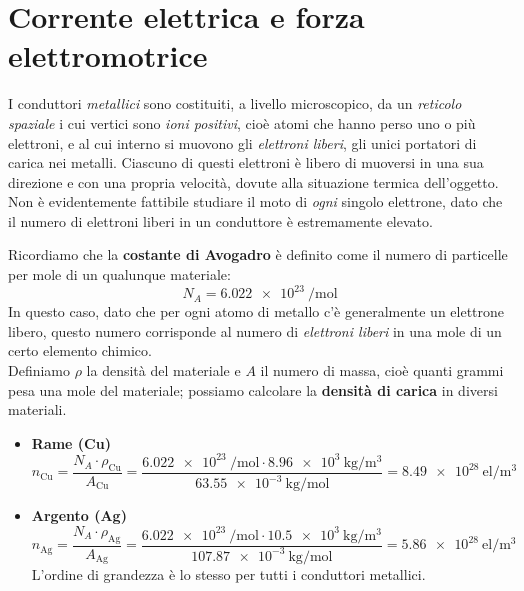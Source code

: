 \section{Corrente elettrica e forza elettromotrice}
I conduttori \textit{metallici} sono costituiti, a livello microscopico, da un \textit{reticolo spaziale} i cui vertici sono \textit{ioni positivi}, cioè atomi che hanno perso uno o più elettroni, e al cui interno si muovono gli \textit{elettroni liberi}, gli unici portatori di carica nei metalli.
Ciascuno di questi elettroni è libero di muoversi in una sua direzione e con una propria velocità, dovute alla situazione termica dell'oggetto. Non è evidentemente fattibile studiare il moto di \textit{ogni} singolo elettrone, dato che il numero di elettroni liberi in un conduttore è estremamente elevato.
\begin{examplewt}
	Ricordiamo che la \textbf{costante di Avogadro} è definito come il numero di particelle per mole di un qualunque materiale:
	\begin{equation*}
		N_A=\SI[exponent-product=\ensuremath{\cdot}]{6,022e23}{\per\mole}
	\end{equation*}
	In questo caso, dato che per ogni atomo di metallo c'è generalmente un elettrone libero, questo numero corrisponde al numero di \textit{elettroni liberi} in una mole di un certo elemento chimico.\\
	Definiamo $\rho$ la densità del materiale e $A$ il numero di massa, cioè quanti grammi pesa una mole del materiale; possiamo calcolare la \textbf{densità di carica} in diversi materiali.
	\begin{itemize}
		\item \textbf{Rame (Cu)}%
		\begin{equation*}
			n_{\textrm{Cu}}=\frac{N_A\cdot\rho_{\mathrm{Cu}}}{A_{\mathrm{Cu}}}=\frac{\SI[exponent-product=\ensuremath{\cdot}]{6,022e23}{\per\mole}\cdot\SI[exponent-product=\ensuremath{\cdot}]{8,96e3}{\kilogram\per\cubic\meter}}{\SI[exponent-product=\ensuremath{\cdot}]{63,55e-3}{\kilogram\per\mole}}=\SI[per-mode = fraction,exponent-product=\ensuremath{\cdot}]{8,49e28}{\mathrm{el}\per\cubic\metre}
		\end{equation*} 
		\item \textbf{Argento (Ag)}%
		\begin{equation*}
			n_{\textrm{Ag}}=\frac{N_A\cdot\rho_{\mathrm{Ag}}}{A_{\mathrm{Ag}}}=\frac{\SI[exponent-product=\ensuremath{\cdot}]{6,022e23}{\per\mole}\cdot\SI[exponent-product=\ensuremath{\cdot}]{10,5e3}{\kilogram\per\cubic\meter}}{\SI[exponent-product=\ensuremath{\cdot}]{107,87e-3}{\kilogram\per\mole}}=\SI[per-mode = fraction,exponent-product=\ensuremath{\cdot}]{5,86e28}{\mathrm{el}\per\cubic\metre}
		\end{equation*}
	L'ordine di grandezza è lo stesso per tutti i conduttori metallici.
	\end{itemize} 
\end{examplewt}
